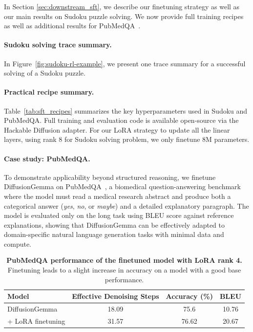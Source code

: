 \documentclass[11pt, a4paper, logo, copyright, gdm]{google}
\begin{document}
In Section \ref{sec:downstream_sft}, we describe our finetuning strategy as well as our main results on Sudoku puzzle solving. We now  provide full training recipes as well as additional results for PubMedQA~\citep{jin2019pubmedqa}. 

\paragraph{Sudoku solving trace summary.} In Figure~\ref{fig:sudoku-rl-example}, we present one trace summary for a successful solving of a Sudoku puzzle. 





\paragraph{Practical recipe summary.} Table~\ref{tab:sft_recipes} summarizes the key hyperparameters used in Sudoku and PubMedQA. Full training and evaluation code is available open-source via the Hackable Diffusion adapter. For our LoRA strategy to update all the linear layers, using rank 8 for Sudoku solving problem, we only finetune 8M parameters. 

\paragraph{Case study: PubMedQA.} To demonstrate applicability beyond structured reasoning, we finetune DiffusionGemma on PubMedQA~\citep{jin2019pubmedqa}, a biomedical question-answering benchmark where the model must read a medical research abstract and produce both a categorical answer (\emph{yes}, \emph{no}, or \emph{maybe}) and a detailed explanatory paragraph. The model is evaluated only on the long task using BLEU score against reference explanations, showing that DiffusionGemma can be effectively adapted to domain-specific natural language generation tasks with minimal data and compute.



\begin{table}[H]
\centering
\begin{tabular}{lccc}
\toprule
Model & Effective Denoising Steps & Accuracy (\%) & BLEU \\
\midrule
DiffusionGemma & 18.09 & 75.6 & 10.76 \\
+ LoRA finetuning & 31.57 & 76.62 & 20.67 \\
\bottomrule
\end{tabular}
\caption{\textbf{PubMedQA performance of the finetuned model with LoRA rank 4.} Finetuning leads to a slight increase in accuracy on a model with a good base performance.}
\label{tab:pubmedqa_steps_vs_perf}
\end{table}
\end{document}
